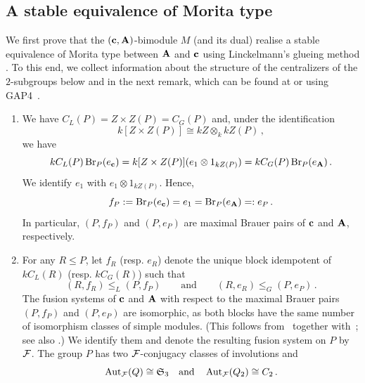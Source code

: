 \subsection{A stable
equivalence of Morita type}\label{ssec:stEqMorTp}
We first prove that the $({\mathbf{c}},{\mathbf{A}})$-bimodule $M$ (and its dual) realise a stable equivalence of Morita type between ${\mathbf{A}}$ and ${\mathbf{c}}$ using Linckelmann's glueing method \cite[Theorem~3.1]{Lin01}. To this end, we collect information about the structure of the centralizers of the $2$-subgroups below and in the next remark, which can be found at \cite[Groups/Abstract/7560.g]{lmfdb} or using GAP4~\cite{GAP}.
\begin{nota}\label{nota:Section_3A7_part_II}\leavevmode
\begin{enumerate}[label=(\arabic*),start=13]
    \item\label{nota:local-3A7} 
    We have 
    \(
C_L(P)=Z\times Z(P)=C_G(P)
\)
and, under the identification
\[
k[Z\times Z(P)]\cong kZ\otimes_k kZ(P)\,,
\]
we have
\[
kC_L(P)\operatorname{Br}_P(e_{\mathbf{c}})=k[Z\times Z(P)](e_1\otimes 1_{kZ(P)})=kC_G(P)\operatorname{Br}_P(e_{\mathbf{A}})\,.
\]
We identify $e_1$ with $e_1\otimes 1_{kZ(P)}$. Hence,
\[
f_P:=\operatorname{Br}_P(e_{\mathbf{c}})=e_1=\operatorname{Br}_P(e_{\mathbf{A}})=: e_P\,.
\]
In particular, $(P,f_P)$ and $(P,e_P)$ are maximal Brauer pairs of ${\mathbf{c}}$ and ${\mathbf{A}}$, respectively.
\item For any $R\le P$, let $f_R$ (resp. $e_R$) denote the unique block idempotent of $kC_L(R)$ (resp. $kC_G(R)$) such that 
\[(R,f_R)\le_L(P,f_P)\qquad\text{and}\qquad (R,e_R)\le_G (P,e_P)\,.
\] 
The fusion systems of ${\mathbf{c}}$ and ${\mathbf{A}}$ with respect to the maximal Brauer pairs $(P,f_P)$ and $(P,e_P)$ are isomorphic, as both blocks have the same number of isomorphism classes of simple modules. 
(This follows from~\cite[Part IV, Section 5.7]{AschKessOli11} together
with~\cite{BrauerDihedral}; see also \cite[Theorem 8.1(2)]{Sambale14}.)
We identify them and denote the resulting fusion system on $P$ by~$\mathcal{F}$. The group $P$ has two $\mathcal{F}$-conjugacy classes of involutions and
\[
\operatorname{Aut}_{\mathcal{F}}(Q)\cong {\mathfrak{S}}_3\quad\text{and}\quad \operatorname{Aut}_{\mathcal{F}}(Q_2)\cong C_2\,.
\]
\end{enumerate}
\end{nota}


